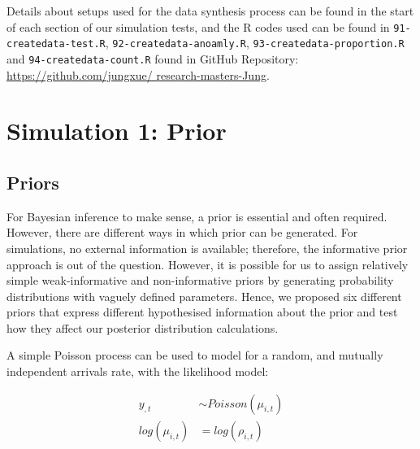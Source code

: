 \newpara

Details about setups used for the data synthesis process can be found in the start of each section of our simulation tests, and the R codes used can be found in \texttt{91-createdata-test.R}, \texttt{92-createdata-anoamly.R}, \texttt{93-createdata-proportion.R} and \texttt{94-createdata-count.R} found in GitHub Repository: \href{https://github.com/jungxue/research-masters-Jung}{https://github.com/jungxue/ research-masters-Jung}. 

\newpage

\section{Simulation 1: Prior}

\subsection{Priors}

For Bayesian inference to make sense, a prior is essential and often required. However, there are different ways in which prior can be generated. For simulations, no external information is available; therefore, the informative prior approach is out of the question. However, it is possible for us to assign relatively simple weak-informative and non-informative priors by generating probability distributions with vaguely defined parameters. Hence, we proposed six different priors that express different hypothesised information about the prior and test how they affect our posterior distribution calculations. 
\newpara

A simple Poisson process can be used to model for a random, and mutually independent arrivals rate, with the likelihood model:

\begin{equation*} \label{Poisson}
\begin{aligned}
y_{,t} & \sim Poisson(\mu_{i,t}) \\  
log(\mu_{i,t}) & = log(\rho_{i,t}) \\
\end{aligned}
\end{equation*}

